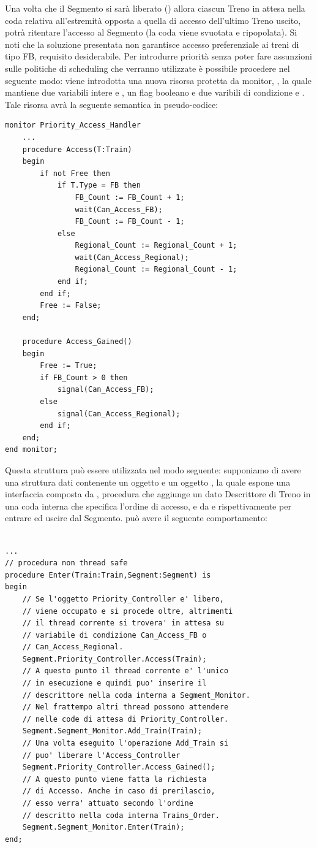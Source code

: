 \begin{description}
			Una volta che il Segmento si sarà liberato () allora ciascun Treno in attesa nella coda relativa all'estremità opposta a quella di accesso dell'ultimo Treno uscito, potrà ritentare l'accesso al Segmento (la coda viene svuotata e ripopolata).
			Si noti che la soluzione presentata non garantisce accesso preferenziale ai treni di tipo FB, requisito desiderabile. Per introdurre priorità senza poter fare assunzioni sulle politiche di scheduling che verranno utilizzate è possibile procedere nel seguente modo: viene introdotta una nuova risorsa protetta da monitor, , la quale mantiene due variabili intere  e , un flag booleano  e due varibili di condizione  e . Tale risorsa avrà la seguente semantica in pseudo-codice:
	
\begin{lstlisting}
monitor Priority_Access_Handler 
	...
	procedure Access(T:Train) 
	begin
		if not Free then
			if T.Type = FB then
				FB_Count := FB_Count + 1;
				wait(Can_Access_FB);
				FB_Count := FB_Count - 1;
			else
				Regional_Count := Regional_Count + 1;
				wait(Can_Access_Regional);
				Regional_Count := Regional_Count - 1;
			end if;
		end if;
		Free := False;
	end;
	
	procedure Access_Gained()
	begin
		Free := True;
		if FB_Count > 0 then
			signal(Can_Access_FB);
		else
			signal(Can_Access_Regional);
		end if;
	end;
end monitor;
\end{lstlisting}
			
			Questa struttura può essere utilizzata nel modo seguente: supponiamo di avere una struttura dati contenente un oggetto  e un oggetto , la quale espone una interfaccia composta da , procedura che aggiunge un dato Descrittore di Treno in una coda interna  che specifica l'ordine di accesso, e da  e  rispettivamente per entrare ed uscire dal Segmento.  può avere il seguente comportamento:
			
\begin{lstlisting}
	
...
// procedura non thread safe
procedure Enter(Train:Train,Segment:Segment) is
begin
	// Se l'oggetto Priority_Controller e' libero, 
	// viene occupato e si procede oltre, altrimenti 
	// il thread corrente si trovera' in attesa su  
	// variabile di condizione Can_Access_FB o 
	// Can_Access_Regional.
	Segment.Priority_Controller.Access(Train);
	// A questo punto il thread corrente e' l'unico  
	// in esecuzione e quindi puo' inserire il  
	// descrittore nella coda interna a Segment_Monitor. 
	// Nel frattempo altri thread possono attendere
	// nelle code di attesa di Priority_Controller.
	Segment.Segment_Monitor.Add_Train(Train);
	// Una volta eseguito l'operazione Add_Train si 
	// puo' liberare l'Access_Controller
	Segment.Priority_Controller.Access_Gained();
	// A questo punto viene fatta la richiesta 
	// di Accesso. Anche in caso di prerilascio, 
	// esso verra' attuato secondo l'ordine 
	// descritto nella coda interna Trains_Order.
	Segment.Segment_Monitor.Enter(Train);
end;
	

\end{lstlisting}
\end{description}

